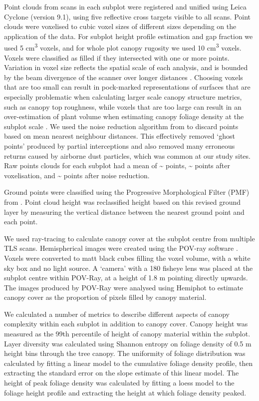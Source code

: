 \documentclass[11pt,a4paper]{article}
\begin{document}
Point clouds from scans in each subplot were registered and unified using Leica Cyclone (version 9.1), using five reflective cross targets visible to all scans. Point clouds were voxelised to cubic voxel sizes of different sizes depending on the application of the data. For subplot height profile estimation and gap fraction we used 5 cm\textsuperscript{3} voxels, and for whole plot canopy rugosity we used 10 cm\textsuperscript{3} voxels. Voxels were classified as filled if they intersected with one or more points. Variation in voxel size reflects the spatial scale of each analysis, and is bounded by the beam divergence of the scanner over longer distances \citep{}. Choosing voxels that are too small can result in pock-marked representations of surfaces that are especially problematic when calculating larger scale canopy structure metrics, such as canopy top roughness, while voxels that are too large can result in an over-estimation of plant volume when estimating canopy foliage density at the subplot scale \citep{Seidel2012, Cifuentes2014}. We used the noise reduction algorithm from \citet{Rusu2008} to discard points based on mean nearest neighbour distances. This effectively removed `ghost points' produced by partial interceptions and also removed many erroneous returns caused by airborne dust particles, which was common at our study sites. Raw points clouds for each subplot had a mean of \textasciitilde{}\rawpt{} points, \textasciitilde{}\voxelpt{} points after voxelisation, and \textasciitilde{}\subpt{} points after noise reduction.

Ground points were classified using the Progressive Morphological Filter (PMF) from \citet{Zhang2003}. Point cloud height was reclassified height based on this revised ground layer by measuring the vertical distance between the nearest ground point and each point.

We used ray-tracing to calculate canopy cover at the subplot centre from multiple TLS scans. Hemispherical images were created using the POV-ray software \citep{}. Voxels were converted to matt black cubes filling the voxel volume, with a white sky box and no light source. A `camera' with a 180\textdegree{} fisheye lens was placed at the subplot centre within POV-Ray, at a height of 1.8 m pointing directly upwards. The images produced by POV-Ray were analysed using Hemiphot \citep{HemiPhot} to estimate canopy cover as the proportion of pixels filled by canopy material.

We calculated a number of metrics to describe different aspects of canopy complexity within each subplot in addition to canopy cover. Canopy height was measured as the 99th percentile of height of canopy material within the subplot. Layer diversity was calculated using Shannon entropy on foliage density of 0.5 m height bins through the tree canopy. The uniformity of foliage distribution was calculated by fitting a linear model to the cumulative foliage density profile, then extracting the standard error on the slope estimate of this linear model. The height of peak foliage density was calculated by fitting a loess model to the foliage height profile and extracting the height at which foliage density peaked.  
\end{document}
